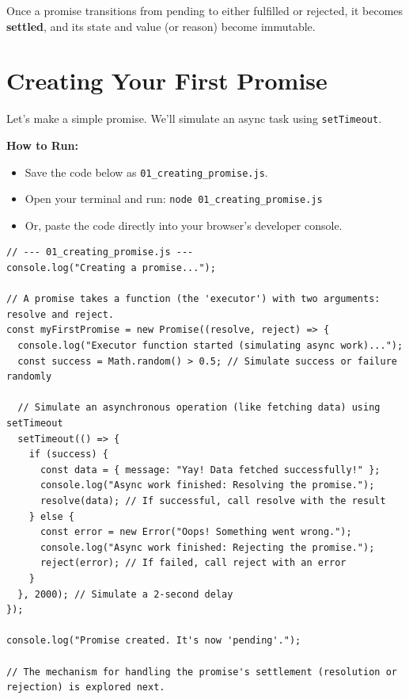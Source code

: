 \documentclass[12pt,letterpaper]{article}
\newenvironment{macterminal}{%
    \begin{mdframed}[
        linecolor=terminalFrame,
        backgroundcolor=terminalBg,
        roundcorner=5pt,
        skipabove=5pt,
        skipbelow=5pt,
        linewidth=1pt,
        innertopmargin=5pt,
        frametitle={%
            \tikz[baseline=(current bounding box.east), outer sep=0pt]{
                \fill[red!80!black] (0,0) circle (5pt);
                \fill[yellow!80!black] (0.7,0) circle (5pt);
                \fill[green!70!black] (1.4,0) circle (5pt);
            }
        },
        frametitlealignment=\raggedright,
        frametitleaboveskip=8pt,
        frametitlebelowskip=0pt,
    ]
}{%
    \end{mdframed}%
}
\begin{document}
Once a promise transitions from pending to either fulfilled or rejected, it becomes \textbf{settled}, and its state and value (or reason) become immutable.

\section{Creating Your First Promise}

Let's make a simple promise. We'll simulate an async task using \texttt{\textcolor{accentColor}{setTimeout}}.

\textbf{How to Run:}
\begin{itemize}
    \item Save the code below as \verb|01_creating_promise.js|.
    \item Open your terminal and run: \verb|node 01_creating_promise.js|
    \item Or, paste the code directly into your browser's developer console.
\end{itemize}
\begin{macterminal}
\begin{lstlisting}
// --- 01_creating_promise.js ---
console.log("Creating a promise...");

// A promise takes a function (the 'executor') with two arguments: resolve and reject.
const myFirstPromise = new Promise((resolve, reject) => {
  console.log("Executor function started (simulating async work)...");
  const success = Math.random() > 0.5; // Simulate success or failure randomly

  // Simulate an asynchronous operation (like fetching data) using setTimeout
  setTimeout(() => {
    if (success) {
      const data = { message: "Yay! Data fetched successfully!" };
      console.log("Async work finished: Resolving the promise.");
      resolve(data); // If successful, call resolve with the result
    } else {
      const error = new Error("Oops! Something went wrong.");
      console.log("Async work finished: Rejecting the promise.");
      reject(error); // If failed, call reject with an error
    }
  }, 2000); // Simulate a 2-second delay
});

console.log("Promise created. It's now 'pending'.");

// The mechanism for handling the promise's settlement (resolution or rejection) is explored next.
\end{lstlisting}
\end{macterminal}
\end{document}

